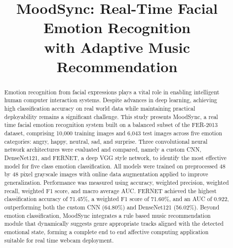 \documentclass[conference]{IEEEtran}
\begin{document}
\title{MoodSync: Real-Time Facial Emotion Recognition\\with Adaptive Music Recommendation}

\author{
\and
{}
}

\maketitle

\begin{abstract}
Emotion recognition from facial expressions plays a vital role in enabling
intelligent human computer interaction systems. Despite advances in deep
learning, achieving high classification accuracy on real world data while
maintaining practical deployability remains a significant challenge. This
study presents MoodSync, a real time facial emotion recognition system built
on a balanced subset of the FER-2013 dataset, comprising 10,000 training
images and 6,043 test images across five emotion categories: angry, happy,
neutral, sad, and surprise. Three convolutional neural network architectures
were evaluated and compared, namely a custom CNN, DenseNet121, and FERNET,
a deep VGG style network, to identify the most effective model for five
class emotion classification. All models were trained on preprocessed
48 by 48 pixel grayscale images with online data augmentation applied to
improve generalization. Performance was measured using accuracy, weighted
precision, weighted recall, weighted F1 score, and macro average AUC.
FERNET achieved the highest classification accuracy of 71.45\%, a weighted
F1 score of 71.60\%, and an AUC of 0.922, outperforming both the custom
CNN (64.80\%) and DenseNet121 (56.02\%). Beyond emotion classification,
MoodSync integrates a rule based music recommendation module that dynamically
suggests genre appropriate tracks aligned with the detected emotional state,
forming a complete end to end affective computing application suitable for
real time webcam deployment.
\end{abstract}
\end{document}
